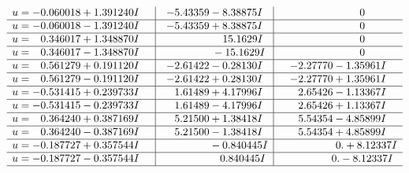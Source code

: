 \documentclass[1p]{elsarticle_modified}
\theoremstyle{definition}
\begin{document}
$$\begin{array}{c|c|c}
\begin{aligned}
u &= -0.060018 + 1.391240 I\end{aligned}
 & -5.43359 - 8.38875 I & \phantom{-0.000000 } 0 \\ \hline\begin{aligned}
u &= -0.060018 - 1.391240 I\end{aligned}
 & -5.43359 + 8.38875 I & \phantom{-0.000000 } 0 \\ \hline\begin{aligned}
u &= \phantom{-}0.346017 + 1.348870 I\end{aligned}
 & \phantom{-0.000000 -}15.1629 I & \phantom{-0.000000 } 0 \\ \hline\begin{aligned}
u &= \phantom{-}0.346017 - 1.348870 I\end{aligned}
 & \phantom{-0.000000 } -15.1629 I & \phantom{-0.000000 } 0 \\ \hline\begin{aligned}
u &= \phantom{-}0.561279 + 0.191120 I\end{aligned}
 & -2.61422 - 0.28130 I & -2.27770 - 1.35961 I \\ \hline\begin{aligned}
u &= \phantom{-}0.561279 - 0.191120 I\end{aligned}
 & -2.61422 + 0.28130 I & -2.27770 + 1.35961 I \\ \hline\begin{aligned}
u &= -0.531415 + 0.239733 I\end{aligned}
 & \phantom{-}1.61489 + 4.17996 I & \phantom{-}2.65426 - 1.13367 I \\ \hline\begin{aligned}
u &= -0.531415 - 0.239733 I\end{aligned}
 & \phantom{-}1.61489 - 4.17996 I & \phantom{-}2.65426 + 1.13367 I \\ \hline\begin{aligned}
u &= \phantom{-}0.364240 + 0.387169 I\end{aligned}
 & \phantom{-}5.21500 + 1.38418 I & \phantom{-}5.54354 - 4.85899 I \\ \hline\begin{aligned}
u &= \phantom{-}0.364240 - 0.387169 I\end{aligned}
 & \phantom{-}5.21500 - 1.38418 I & \phantom{-}5.54354 + 4.85899 I \\ \hline\begin{aligned}
u &= -0.187727 + 0.357544 I\end{aligned}
 & \phantom{-0.000000 } -0.840445 I & \phantom{-0.000000 -}0. + 8.12337 I \\ \hline\begin{aligned}
u &= -0.187727 - 0.357544 I\end{aligned}
 & \phantom{-0.000000 -}0.840445 I & \phantom{-0.000000 } 0. - 8.12337 I\\
 \hline 
 \end{array}$$\newpage
\end{document}
